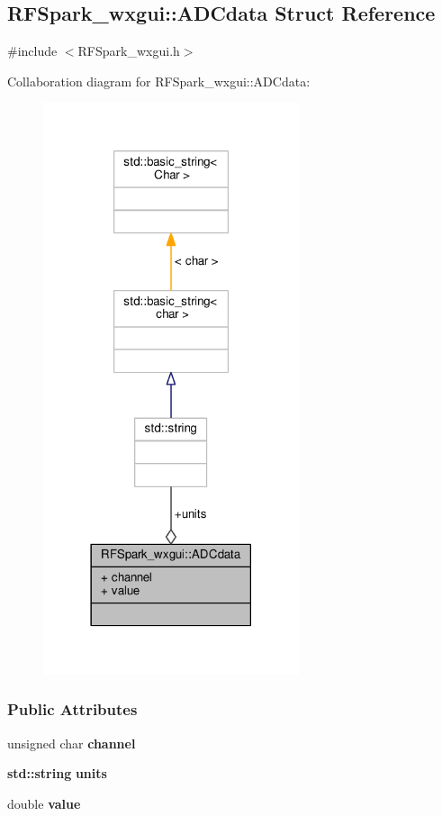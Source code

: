 \subsection{R\+F\+Spark\+\_\+wxgui\+:\+:A\+D\+Cdata Struct Reference}
\label{structRFSpark__wxgui_1_1ADCdata}


{\ttfamily \#include $<$R\+F\+Spark\+\_\+wxgui.\+h$>$}



Collaboration diagram for R\+F\+Spark\+\_\+wxgui\+:\+:A\+D\+Cdata\+:
\nopagebreak
\begin{figure}[H]
\begin{center}
\leavevmode
\includegraphics[width=213pt]{de/d67/structRFSpark__wxgui_1_1ADCdata__coll__graph}
\end{center}
\end{figure}
\subsubsection*{Public Attributes}
\begin{DoxyCompactItemize}
\item 
unsigned char {\bf channel}
\item 
{\bf std\+::string} {\bf units}
\item 
double {\bf value}
\end{DoxyCompactItemize}


